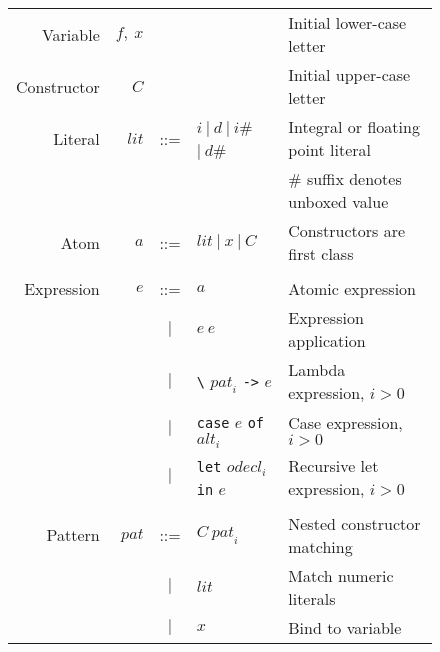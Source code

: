 \documentclass{llncs}
\begin{document}
\newcommand{\hash}{{\scriptsize\#}}

\begin{figure}[h!tb]
\centering
\footnotesize %
\begin{tabular}{r r c l l}
Variable         & $f,\ x$             &     &  & Initial lower-case letter \\

Constructor        & $C$                 &     & & Initial upper-case letter \\

Literal            & $\mathit{lit}$      & ::= & $i\ |\ d\ 
                                                 |\ i$\hash\ $|\ d$\hash & Integral or floating point literal \\

                   &                     &     &  & \# suffix denotes unboxed value \\

Atom               & $a$                 & ::= & $\mathit{lit}\ |\ x\ |\ C$ & Constructors are first class \\
\\


Expression         & $e$                 & ::= & $a$ & Atomic expression \\

                   &                     & $|$ & $e\ e$ & Expression application \\

                   &                     & $|$ & \texttt{\textbackslash} $\mathit{pat}_i$ 
                                                 \texttt{->} $e$ & Lambda expression, $i > 0$ \\

                   &                     & $|$ & \texttt{case} $e$ \texttt{of} $\mathit{alt}_i$ & Case expression, $i > 0$\\

                   &                     & $|$ & \texttt{let} $\mathit{odecl}_i$ \texttt{in} $e$ & Recursive let expression, $i > 0$ \\

\\
Pattern            & $\mathit{pat}$      & ::= & $C\ \mathit{pat}_i$ & Nested constructor matching \\
                   &                     & $|$ & $\mathit{lit}$ & Match numeric literals \\
                   &                     & $|$ & $x$ & Bind to variable \\


\end{tabular}
\end{figure}
\end{document}
